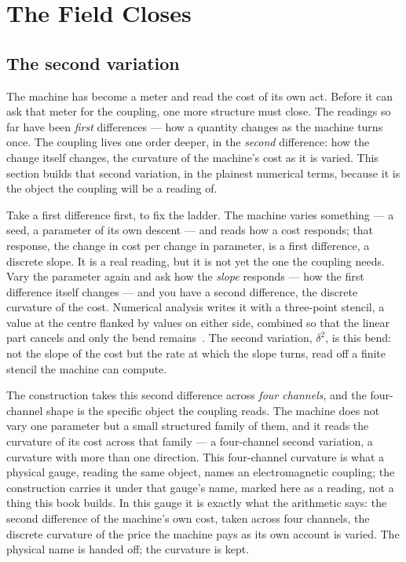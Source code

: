 \chapter{The Field Closes}

\section{The second variation}

The machine has become a meter and read the cost of its own act. Before it can ask that meter for the coupling, one more
structure must close. The readings so far have been \emph{first} differences --- how a quantity changes as the machine
turns once. The coupling lives one order deeper, in the \emph{second} difference: how the change itself changes, the
curvature of the machine's cost as it is varied. This section builds that second variation, in the plainest numerical
terms, because it is the object the coupling will be a reading of.

Take a first difference first, to fix the ladder. The machine varies something --- a seed, a parameter of its own
descent --- and reads how a cost responds; that response, the change in cost per change in parameter, is a first
difference, a discrete slope. It is a real reading, but it is not yet the one the coupling needs. Vary the parameter
again and ask how the \emph{slope} responds --- how the first difference itself changes --- and you have a second
difference, the discrete curvature of the cost. Numerical analysis writes it with a three-point stencil, a value at the
centre flanked by values on either side, combined so that the linear part cancels and only the bend remains~\cite{golub2013}. The second variation, $\delta^2$, is this bend: not the slope of the cost but the rate at which the slope
turns, read off a finite stencil the machine can compute.

The construction takes this second difference across \emph{four channels}, and the four-channel shape is the specific
object the coupling reads. The machine does not vary one parameter but a small structured family of them, and it reads
the curvature of its cost across that family --- a four-channel second variation, a curvature with more than one
direction. This four-channel curvature is what a physical gauge, reading the same object, names an electromagnetic
coupling; the construction carries it under that gauge's name, marked here as a reading, not a thing this book builds. In
this gauge it is exactly what the arithmetic says: the second difference of the machine's own cost, taken across four
channels, the discrete curvature of the price the machine pays as its own account is varied. The physical name is handed
off; the curvature is kept.

